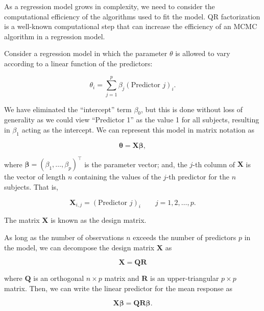 \documentclass[
  letterpaper,
  DIV=11,
  numbers=noendperiod]{scrreprt}
\theoremstyle{definition}
\theoremstyle{definition}
\theoremstyle{plain}
\theoremstyle{remark}
\begin{document}
\providecommand{\norm}[1]{\lVert#1\rVert}
\providecommand{\abs}[1]{\lvert#1\rvert}
\providecommand{\iid}{\stackrel{\text{IID}}{\sim}}
\providecommand{\ind}{\stackrel{\text{Ind}}{\sim}}

\providecommand{\bm}[1]{\mathbf{#1}}
\providecommand{\bs}[1]{\boldsymbol{#1}}
\providecommand{\bbeta}{\bs{\beta}}

\providecommand{\Ell}{\mathcal{L}}
\providecommand{\indep}{\perp\negthickspace\negmedspace\perp}

As a regression model grows in complexity, we need to consider the
computational efficiency of the algorithms used to fit the model. QR
factorization is a well-known computational step that can increase the
efficiency of an MCMC algorithm in a regression model.

Consider a regression model in which the parameter \(\theta\) is allowed
to vary according to a linear function of the predictors:

\[\theta_i = \sum_{j=1}^{p} \beta_j (\text{Predictor } j)_i.\]

We have eliminated the ``intercept'' term \(\beta_0\), but this is done
without loss of generality as we could view ``Predictor 1'' as the value
1 for all subjects, resulting in \(\beta_1\) acting as the intercept. We
can represent this model in matrix notation as

\[\boldsymbol{\theta} = \mathbf{X} \boldsymbol{\beta},\]

where
\(\boldsymbol{\beta} = \left(\beta_1, \dotsc, \beta_p\right)^\top\) is
the parameter vector; and, the \(j\)-th column of \(\mathbf{X}\) is the
vector of length \(n\) containing the values of the \(j\)-th predictor
for the \(n\) subjects. That is,

\[\mathbf{X}_{i, j} = (\text{Predictor } j)_i \qquad j=1,2,\dots,p.\]

The matrix \(\mathbf{X}\) is known as the design matrix.

As long as the number of observations \(n\) exceeds the number of
predictors \(p\) in the model, we can decompose the design matrix
\(\mathbf{X}\) as

\[\mathbf{X} = \mathbf{Q}\mathbf{R}\]

where \(\mathbf{Q}\) is an orthogonal \(n \times p\) matrix and
\(\mathbf{R}\) is an upper-triangular \(p \times p\) matrix. Then, we
can write the linear predictor for the mean response as

\[\mathbf{X}\boldsymbol{\beta} = \mathbf{Q}\mathbf{R}\boldsymbol{\beta}.\]
\end{document}
